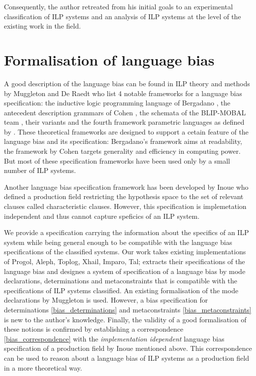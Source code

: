 Consequently, the author retreated from his initial goals to an experimental classification of ILP systems and an analysis of ILP systems at the level of the existing work \cite{nienhuys1997foundations}\cite{muggleton1995inverse}\cite{yamamoto2012inverse} in the field.

\section{Formalisation of language bias}
A good description of the language bias can be found in ILP theory and methods by Muggleton and De Raedt \cite{muggleton1994inductive} who list 4 notable frameworks for a language bias specification: the inductive logic programming language of
Bergadano \cite{bergadano1993interactive}, the antecedent description grammars of Cohen \cite{cohen1994grammatically}\cite{cohen1992compiling}, the schemata of
the BLIP-MOBAL team \cite{emde1983discovery}\cite{kietz1992controlling}, their variants \cite{de1992interactive}\cite{silverstein1991relational}
\cite{tausend1994representing} and the fourth framework parametric languages as defined by \cite{muggleton1992efficient}\cite{de1992interactive}
\cite{buntine1987induction}\cite{cohen1993learnability}.
These theoretical frameworks are designed to support a cetain feature of the language bias and its specification: Bergadano's framework aims at readability, the framework by Cohen targets generality and efficiency in computing power.
But most of these specification frameworks have been used only by a small number of ILP systems.

Another language bias specification framework has been developed by Inoue \cite{inoue1992linear} who defined a production field restricting the hypothesis space to the set of relevant clauses called characteristic clauses. However, this specification is implemetation independent and thus cannot capture speficics of an ILP system.

We provide a specification carrying the information about the specifics of an ILP system while being general enough to be compatible with the language bias specifications of the classified systems.
Our work takes existing implementations of Progol, Aleph, Toplog, Xhail, Imparo, Tal; extracts their specifications of the language bias and designes a system of specification of a language bias by mode declarations, determinations and metaconstraints that is compatible with the specifications of ILP systems classified. An existing formalisation of the mode declarations by Muggleton \cite{muggleton1995inverse} is used. However, a bias specification for determinations \ref{bias_determinations} and metaconstraints \ref{bias_metaconstraints} is new to the author's knowledge. Finally, the validity of a good formalisation of these notions is confirmed by establishing a correspondence \ref{bias_correspondence} with the \emph{implementation idependent} language bias specification of a production field by Inoue \cite{inoue1992linear} mentioned above. This correspondence can be used to reason about a language bias of ILP systems as a production field in a more theoretical way.

